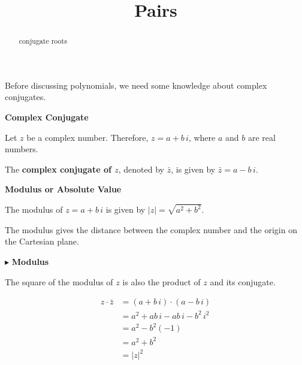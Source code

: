 \documentclass{ximera}
\title{Pairs}
\begin{document}
\begin{abstract}
conjugate roots
\end{abstract}
\maketitle







Before discussing polynomials, we need some knowledge about complex conjugates.




\begin{definition} \textbf{\textcolor{green!50!black}{Complex Conjugate}} 

Let $z$ be a complex number.  Therefore, $z = a + b \, i$, where $a$ and $b$ are real numbers.



The \textbf{complex conjugate of $z$}, denoted by $\bar{z}$, is given by $\bar{z} = a - b \, i$.



\end{definition}












\begin{definition}   \textbf{\textcolor{green!50!black}{Modulus or Absolute Value}} 

The modulus of $z = a + b \, i$ is given by $|z| = \sqrt{a^2 + b^2}$. 


\end{definition}

The modulus gives the distance between the complex number and the origin on the Cartesian plane. 



$\blacktriangleright$ \textbf{Modulus}  

The square of the modulus of $z$ is also the product of $z$ and its conjugate.


\begin{explanation}

\begin{align*}
z \cdot \bar{z} &= (a + b \, i) \cdot (a - b \, i) \\
                &= a^2 + ab \, i - ab \, i - b^2 \, i^2 \\
                &= a^2 - b^2 (-1) \\
                &= a^2 + b^2  \\
                &= |z|^2  
\end{align*}


\end{explanation}
\end{document}
